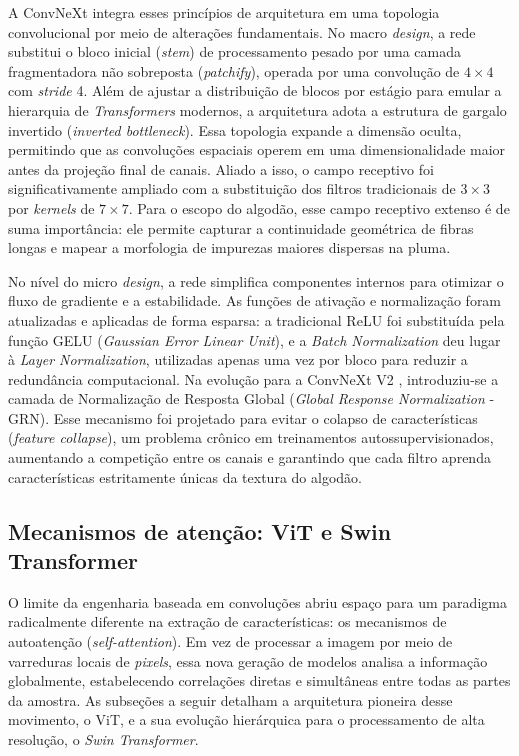         A ConvNeXt integra esses princípios de arquitetura em uma topologia convolucional por meio de alterações fundamentais. No macro \textit{design}, a rede substitui o bloco inicial (\textit{stem}) de processamento pesado por uma camada fragmentadora não sobreposta (\textit{patchify}), operada por uma convolução de $4 \times 4$ com \textit{stride} 4. Além de ajustar a distribuição de blocos por estágio para emular a hierarquia de \textit{Transformers} modernos, a arquitetura adota a estrutura de gargalo invertido (\textit{inverted bottleneck}). Essa topologia expande a dimensão oculta, permitindo que as convoluções espaciais operem em uma dimensionalidade maior antes da projeção final de canais. Aliado a isso, o campo receptivo foi significativamente ampliado com a substituição dos filtros tradicionais de $3 \times 3$ por \textit{kernels} de $7 \times 7$. Para o escopo do algodão, esse campo receptivo extenso é de suma importância: ele permite capturar a continuidade geométrica de fibras longas e mapear a morfologia de impurezas maiores dispersas na pluma.

        No nível do micro \textit{design}, a rede simplifica componentes internos para otimizar o fluxo de gradiente e a estabilidade. As funções de ativação e normalização foram atualizadas e aplicadas de forma esparsa: a tradicional ReLU foi substituída pela função GELU (\textit{Gaussian Error Linear Unit}), e a \textit{Batch Normalization} deu lugar à \textit{Layer Normalization}, utilizadas apenas uma vez por bloco para reduzir a redundância computacional. Na evolução para a ConvNeXt V2 \cite{woo2023convnext}, introduziu-se a camada de Normalização de Resposta Global (\textit{Global Response Normalization} - GRN). Esse mecanismo foi projetado para evitar o colapso de características (\textit{feature collapse}), um problema crônico em treinamentos autossupervisionados, aumentando a competição entre os canais e garantindo que cada filtro aprenda características estritamente únicas da textura do algodão.


\subsection{Mecanismos de atenção: ViT e Swin Transformer}

    O limite da engenharia baseada em convoluções abriu espaço para um paradigma radicalmente diferente na extração de características: os mecanismos de autoatenção (\textit{self-attention}). Em vez de processar a imagem por meio de varreduras locais de \textit{pixels}, essa nova geração de modelos analisa a informação globalmente, estabelecendo correlações diretas e simultâneas entre todas as partes da amostra. As subseções a seguir detalham a arquitetura pioneira desse movimento, o ViT, e a sua evolução hierárquica para o processamento de alta resolução, o \textit{Swin Transformer}.

